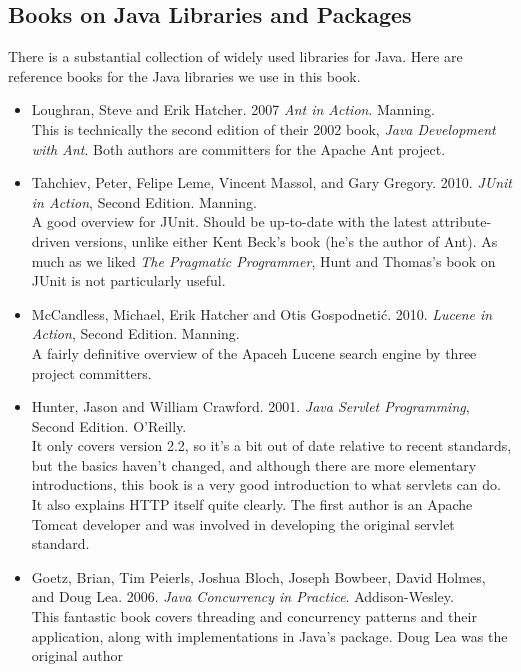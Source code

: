 \subsection{Books on Java Libraries and Packages}

\noindent
There is a substantial collection of widely used libraries for Java.
Here are reference books for the Java libraries we use in this book.
%
\begin{itemize}
%
\item 
Loughran, Steve and Erik Hatcher. 2007
{\it Ant in Action}.  Manning.
\\
{\footnotesize This is technically the second edition of their 2002
book, {\it Java Development with Ant}.  Both authors are committers for
the Apache Ant project.}
%
\item
Tahchiev, Peter, Felipe Leme,
Vincent Massol, and Gary Gregory. 2010.
{\it JUnit in Action}, Second Edition.  Manning.
\\
{\footnotesize A good overview for JUnit.  Should be up-to-date with
the latest attribute-driven versions, unlike either Kent Beck's book
(he's the author of Ant).  As much as we liked {\it The Pragmatic
Programmer}, Hunt and Thomas's book on JUnit is not particularly useful.}
%
\item
McCandless, Michael, Erik Hatcher and Otis Gospodneti\'c.
2010.
{\it Lucene in Action}, Second Edition. Manning.
\\
{\footnotesize A fairly definitive overview of the Apaceh Lucene
search engine by three project committers.}
%
\item
Hunter, Jason and William Crawford. 2001. {\it Java Servlet Programming}, Second Edition. O'Reilly.
\\
{\footnotesize It only covers version 2.2, so it's a bit out of date
relative to recent standards, but the basics haven't changed, and
although there are more elementary introductions, this book is a very
good introduction to what servlets can do.  It also explains HTTP
itself quite clearly.  The first author is an Apache Tomcat developer
and was involved in developing the original servlet standard.}
%
\item
Goetz, Brian, Tim Peierls, Joshua Bloch, Joseph Bowbeer, David Holmes, and Doug Lea. 2006. {\it
Java Concurrency in Practice}.  Addison-Wesley.
\\
{\footnotesize This fantastic book covers threading and concurrency
patterns and their application, along with implementations in Java's
 package.  Doug Lea was the original author
}
\end{itemize}
